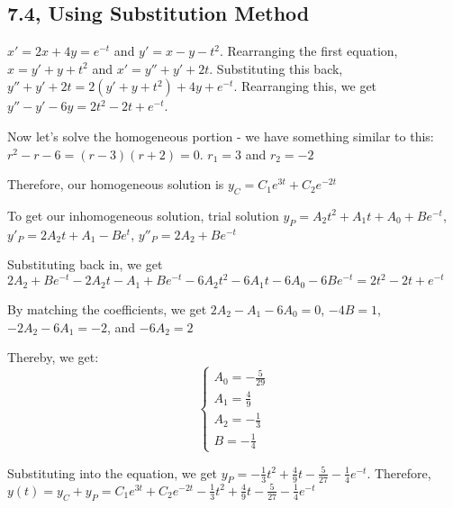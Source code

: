 \documentclass{article}
\begin{document}
\subsection{7.4, Using Substitution Method}

\noindent $x' = 2x + 4y = e^{-t}$ and $y' = x - y - t^{2}$.  Rearranging the first equation, $x = y' + y + t^{2}$ and $x' = y'' + y' + 2t$.  Substituting this back, $y'' + y' + 2t = 2(y' + y + t^{2}) + 4y + e^{-t}$.  Rearranging this, we get $y'' - y' - 6y = 2t^{2} - 2t + e^{-t}$. \par

\noindent Now let's solve the homogeneous portion - we have something similar to this: $r^{2} - r - 6 = (r - 3)(r + 2) = 0$.  $r_{1} = 3$ and $r_{2} = -2$ \par\vspace{0.25cm}

\noindent Therefore, our homogeneous solution is $y_{C} = C_{1}e^{3t} + C_{2}e^{-2t}$ \par\vspace{0.25cm}

\noindent To get our inhomogeneous solution, trial solution $y_{P} = A_{2}t^{2} + A_{1}t + A_{0} + Be^{-t}$, $y'_{P} = 2A_{2}t + A_{1} - Be^{t}$, $y''_{P} = 2A_{2} + Be^{-t}$ \par

\noindent Substituting back in, we get $2A_{2} + Be^{-t} - 2A_{2}t - A_{1} + Be^{-t} - 6A_{2}t^{2} - 6A_{1}t - 6A_{0} - 6Be^{-t} = 2t^{2} - 2t + e^{-t}$ \par\vspace{0.25cm}

\noindent By matching the coefficients, we get $2A_{2} - A_{1} - 6A_{0} = 0$, $-4B = 1$, $-2A_{2} - 6A_{1} = -2$, and $-6A_{2} = 2$ \par

\noindent Thereby, we get: $$
\begin{cases}
A_{0} = -\frac{5}{29}\\
A_{1} = \frac{4}{9} \\
A_{2} = -\frac{1}{3}\\
B = -\frac{1}{4}
\end{cases}
$$ \par
\noindent Substituting into the equation, we get $y_{P} = -\frac{1}{3}t^{2} + \frac{4}{9}t - \frac{5}{27} - \frac{1}{4}e^{-t}$.  Therefore, $y(t) = y_{C} + y_{P} = C_{1}e^{3t} + C_{2}e^{-2t} - \frac{1}{3}t^{2} + \frac{4}{9}t - \frac{5}{27} - \frac{1}{4}e^{-t}$ \par\vspace{0.25cm}
\end{document}
